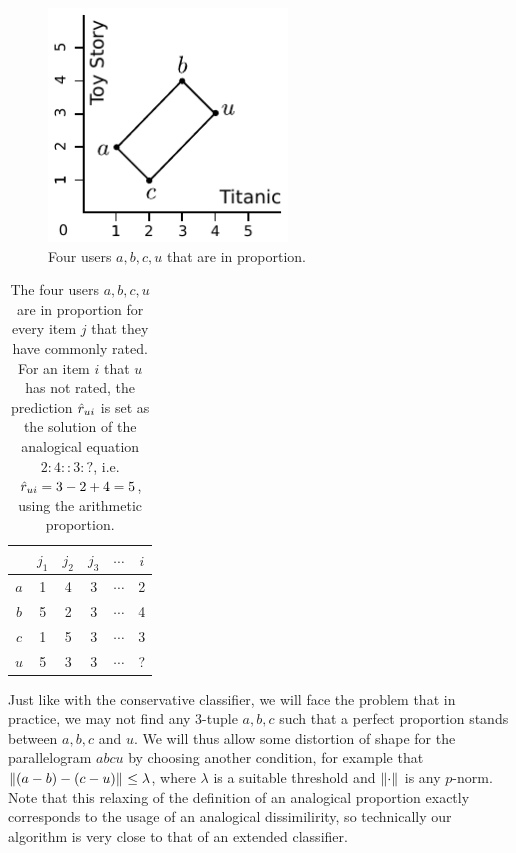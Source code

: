 \begin{figure}[!h]
\centering
  \includegraphics[width=2.5in]{figures/analogical_recommendation.pdf}
  \caption{Four users $a, b, c, u$ that are in proportion.}
\label{FIG:analogical_recommendation}
\end{figure}

\begin{table}[h!]
\centering
  \begin{tabular}{ c   c  c  c  c  c  }
\toprule
 & $j_1$ & $j_2$ & $j_3$ & $\cdots$ & $i$\\
  \midrule
$a$ & 1 & 4  & 3 & $\cdots$ & 2 \\
$b$ & 5 & 2  & 3 & $\cdots$ & 4 \\
$c$ & 1 & 5  & 3 & $\cdots$ & 3 \\
$u$ & 5 & 3  & 3 & $\cdots$ & ? \\
\bottomrule
\end{tabular}
\caption{The four users $a, b, c, u$ are in proportion for every item $j$ that
  they have commonly rated. For an item $i$ that $u$ has not rated, the
  prediction $\hat{r}_{ui}$ is set as the solution of the analogical equation
  $2:4::3:?$, i.e. $\hat{r}_{ui} = 3 - 2 + 4 = 5$, using the arithmetic proportion.}
\label{TAB:analogical_recommendation}
\end{table}

Just like with the conservative classifier, we will face the problem that in
practice, we may not find any $3$-tuple $a, b, c$ such that a perfect
proportion stands between $a, b, c$ and $u$. We will thus allow some distortion
of shape for the parallelogram $abcu$ by choosing another condition, for
example that ${\left\lVert(a-b) - (c-u)\right\rVert}_{} \leq \lambda$, where $\lambda$ is a
suitable threshold and ${\left\lVert\cdot\right\rVert}_{}$ is any $p$-norm. Note that this
relaxing of the definition of an analogical proportion exactly corresponds to
the usage of an analogical dissimilirity, so technically our algorithm is very
close to that of an extended classifier.


